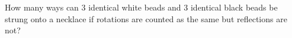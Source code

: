How many ways can $3$ identical white beads and $3$ identical black beads be strung onto a necklace if rotations are counted as the same but reflections are not?
